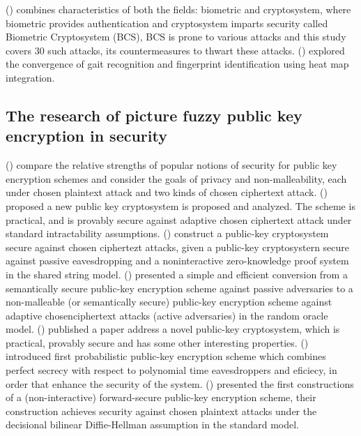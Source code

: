 \documentclass[graybox]{svmult}
\begin{document}
\citeauthor{kaur2023biometric} (\citeyear{kaur2023biometric}) combines characteristics of both the fields: biometric and cryptosystem, where biometric provides authentication and cryptosystem imparts security called Biometric Cryptosystem (BCS), BCS is prone to various attacks and this study covers 30 such attacks, its countermeasures to thwart these attacks.
\citeauthor{trivedi2024approach} (\citeyear{trivedi2024approach}) explored the convergence of gait recognition and fingerprint identification using heat map integration. 
\\[6pt]

\subsection{The research of picture fuzzy public key encryption in security}
\citeauthor{bellare2006relations} (\citeyear{bellare2006relations}) compare the relative strengths of popular notions of security for public key encryption schemes and consider the goals of privacy and non-malleability, each under chosen plaintext attack and two kinds of chosen ciphertext attack.
\citeauthor{cramer1998practical} (\citeyear{cramer1998practical}) proposed a new public key cryptosystem is proposed and analyzed.
The scheme is practical, and is provably secure against adaptive chosen ciphertext attack under standard intractability assumptions.
\citeauthor{naor1990public} (\citeyear{naor1990public}) construct a public-key cryptosystem secure against chosen ciphertezt attacks, given a public-key cryptosystern secure against passive eavesdropping and a noninteractive zero-knowledge proof system in the shared string model.
\citeauthor{fujisaki1999enhance} (\citeyear{fujisaki1999enhance}) presented a simple and efficient conversion from a semantically secure public-key encryption scheme against passive adversaries to a non-malleable (or semantically secure) public-key encryption scheme against adaptive chosenciphertext attacks (active adversaries) in the random oracle model.
\citeauthor{okamoto1998new} (\citeyear{okamoto1998new}) published a paper address a novel public-key cryptosystem, which is practical, provably secure and has some other interesting properties.
\citeauthor{blum1985efficient} (\citeyear{blum1985efficient}) introduced first probabilistic public-key encryption scheme which combines perfect secrecy with respect to polynomial time eavesdroppers and eficiecy, in order that enhance the security of the system.
\citeauthor{canetti2003forward} (\citeyear{canetti2003forward}) presented the first constructions of a (non-interactive) forward-secure public-key encryption scheme, their construction achieves security against chosen plaintext attacks under the decisional bilinear Diffie-Hellman assumption in the standard model.
\end{document}

